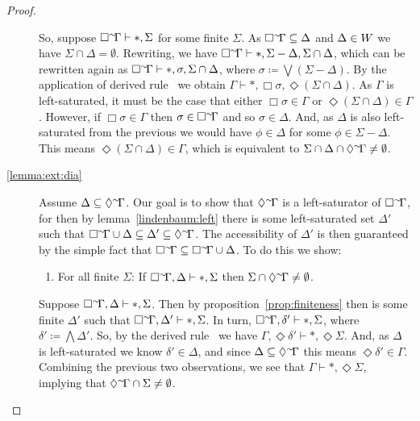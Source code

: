 \documentclass[10pt]{article}
\begin{document}
\begin{lemma}
\begin{proof}
\begin{description}
    So, suppose \({\Box}^{\sim}\hspace*{-2pt}{\Gamma} \vdash \ast,\Sigma\) for some finite \(\Sigma\).
    As \({\Box}^{\sim}\hspace*{-2pt}{\Gamma} \subseteq \Delta\) and \(\Delta \in W\) we have \(\Sigma \cap \Delta = \emptyset\).
    Rewriting, we have \({\Box}^{\sim}\hspace*{-2pt}{\Gamma} \vdash \ast, \Sigma - \Delta,\Sigma \cap \Delta\), which can be rewritten again as \({\Box}^{\sim}\hspace*{-2pt}{\Gamma} \vdash \ast, \sigma, \Sigma \cap \Delta\), where \(\sigma \coloneq \bigvee(\Sigma - \Delta)\).
    By the application of derived rule \ we obtain \(\Gamma \vdash \ast, \Box\sigma, \Diamond(\Sigma \cap \Delta)\).
    As \(\Gamma\) is left-saturated, it must be the case that either \(\Box\sigma \in \Gamma\) or \(\Diamond(\Sigma \cap \Delta) \in \Gamma\).
    However, if \(\Box\sigma \in \Gamma\) then \(\sigma \in {\Box}^{\sim}\hspace*{-2pt}{\Gamma}\) and so \(\sigma \in \Delta\).
    And, as \(\Delta\) is also left-saturated from the previous we would have \(\phi \in \Delta\) for some \(\phi \in \Sigma - \Delta\).
    This means \(\Diamond(\Sigma \cap \Delta) \in \Gamma\), which is equivalent to \(\Sigma \cap \Delta \cap {\Diamond}^{\sim}\hspace*{-2pt}{\Gamma} \ne \emptyset\).

  \item[\ref{lemma:ext:dia}]
    Assume \(\Delta \subseteq {\Diamond}^{\sim}\hspace*{-2pt}{\Gamma}\).
    Our goal is to show that \({\Diamond}^{\sim}\hspace*{-2pt}{\Gamma}\) is a left-saturator of \({\Box}^{\sim}\hspace*{-2pt}{\Gamma}\), for then by lemma~\ref{lindenbaum:left} there is some left-saturated set \(\Delta'\) such that \({\Box}^{\sim}\hspace*{-2pt}{\Gamma} \cup \Delta \subseteq \Delta' \subseteq {\Diamond}^{\sim}\hspace*{-2pt}{\Gamma}\).
    The accessibility of \(\Delta'\) is then guaranteed by the simple fact that \({\Box}^{\sim}\hspace*{-2pt}{\Gamma} \subseteq {\Box}^{\sim}\hspace*{-2pt}{\Gamma} \cup \Delta\).
    To do this we show:
    \begin{enumerate}[resume]
    \item For all finite \(\Sigma\): If \({\Box}^{\sim}\hspace*{-2pt}{\Gamma}, \Delta \vdash \ast, \Sigma\) then \(\Sigma \cap {\Diamond}^{\sim}\hspace*{-2pt}{\Gamma} \ne \emptyset\).
    \end{enumerate}
    Suppose \({\Box}^{\sim}\hspace*{-2pt}{\Gamma}, \Delta \vdash \ast, \Sigma\).
    Then by proposition~\ref{prop:finiteness} then is some finite \(\Delta'\) such that \({\Box}^{\sim}\hspace*{-2pt}{\Gamma}, \Delta' \vdash \ast, \Sigma\).
    In turn, \({\Box}^{\sim}\hspace*{-2pt}{\Gamma}, \delta' \vdash \ast, \Sigma\), where \(\delta' \coloneq \bigwedge\Delta'\).
    So, by the derived rule \ we have \(\Gamma, \Diamond\delta' \vdash \ast, \Diamond\Sigma\).
    And, as \(\Delta\) is left-saturated we know \(\delta' \in \Delta\), and since \(\Delta \subseteq {\Diamond}^{\sim}\hspace*{-2pt}{\Gamma}\) this means \(\Diamond\delta' \in \Gamma\).
    Combining the previous two observations, we see that \(\Gamma \vdash \ast, \Diamond\Sigma\), implying that \({\Diamond}^{\sim}\hspace*{-2pt}{\Gamma} \cap \Sigma \ne \emptyset\).
  \end{description}


\end{proof}
\end{lemma}
\end{document}
